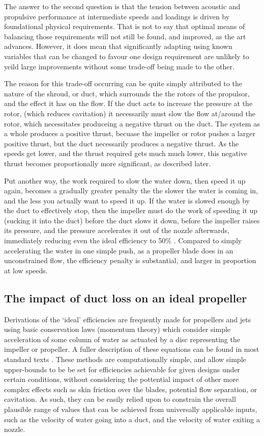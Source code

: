 \documentclass{article}\usepackage[]{graphicx}\usepackage[]{color}
\begin{document}
The answer to the second question is that the tension between acoustic and propulsive performance at intermediate speeds and loadings is driven by foundational physical requirements.  That is not to say that optimal means of balancing those requirements will not still be found, and improved, as the art advances.  However, it does mean that significantly adapting using known variables that can be changed to favour one design requirement are unlikely to yeild large improvements without some trade-off being made to the other.

The reason for this trade-off occurring can be quite simply attributed to the nature of the shroud, or duct, which surrounds the the rotors of the propulsor, and the effect it has on the flow. If the duct acts to increase the pressure at the rotor, (which reduces cavitation) it necessarily must slow the flow at/around the rotor, which necessitates produceing a negative thrust on the duct.  The system as a whole produces a positive thrust, becuase the impeller or rotor pushes a larger positive thrust, but the duct necessarily produces a negative thrust.  As the speeds get lower, and the thrust required gets much much lower, this negative thrust becomes proportionally more significant, as described later.

Put another way, the work required to slow the water down, then speed it up again, becomes a gradually greater penalty the the slower the water is coming in, and the less you actually want to speed it up.  If the water is slowed enough by the duct to effectively stop, then the impeller must do the work of speeding it up (sucking it into the duct) before the duct slows it down, before the impeller raises its pressure, and the pressure accelerates it out of the nozzle afterwards, immediately reducing even the ideal efficiency to 50\% \parencite[277]{lewis1988}. Compared to simply accelerating the water in one simple push, as a propeller blade does in an unconstrained flow, the efficiency penalty is substantial, and larger in proportion at low speeds.

\subsection{The impact of duct loss on an ideal propeller}

Derivations of the `ideal' efficiencies are frequently made for propellers and jets using basic conservation laws (momentum theory) which consider simple acceleration of some column of water as actuated by a disc representing the impeller or propeller.  A fuller description of these equations can be found in  most standard texts \parencite[131]{lewis1988}. These methods are computationally simple, and allow simple upper-bounds to be be set for efficiencies achievable for given designs under certain conditions, without considering the pottential impact of other more complex effects such as skin friction over the blades, potential flow separation, or cavitation.  As such, they can be easily relied upon to constrain the overall plausible range of values that can be achieved from universally applicable inputs, such as the velocity of water going into a duct, and the velocity of water exiting a nozzle.
\end{document}
